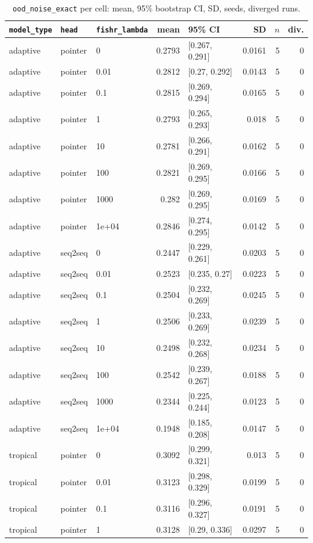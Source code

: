 \documentclass[10pt]{article}
\begin{document}
{\small
\begin{longtable}{lllrlrrr}
\caption{\texttt{ood\_noise\_exact} per cell: mean, 95\% bootstrap CI, SD, seeds, diverged runs.}\label{tab:summary-ood_noise_exact}\\
\toprule
\texttt{model\_type} & \texttt{head} & \texttt{fishr\_lambda} & mean & 95\% CI & SD & $n$ & div.\\
\midrule
\endhead
adaptive & pointer & 0 & 0.2793 & [0.267, 0.291] & 0.0161 & 5 & 0\\
adaptive & pointer & 0.01 & 0.2812 & [0.27, 0.292] & 0.0143 & 5 & 0\\
adaptive & pointer & 0.1 & 0.2815 & [0.269, 0.294] & 0.0165 & 5 & 0\\
adaptive & pointer & 1 & 0.2793 & [0.265, 0.293] & 0.018 & 5 & 0\\
adaptive & pointer & 10 & 0.2781 & [0.266, 0.291] & 0.0162 & 5 & 0\\
adaptive & pointer & 100 & 0.2821 & [0.269, 0.295] & 0.0166 & 5 & 0\\
adaptive & pointer & 1000 & 0.282 & [0.269, 0.295] & 0.0169 & 5 & 0\\
adaptive & pointer & 1e+04 & 0.2846 & [0.274, 0.295] & 0.0142 & 5 & 0\\
adaptive & seq2seq & 0 & 0.2447 & [0.229, 0.261] & 0.0203 & 5 & 0\\
adaptive & seq2seq & 0.01 & 0.2523 & [0.235, 0.27] & 0.0223 & 5 & 0\\
adaptive & seq2seq & 0.1 & 0.2504 & [0.232, 0.269] & 0.0245 & 5 & 0\\
adaptive & seq2seq & 1 & 0.2506 & [0.233, 0.269] & 0.0239 & 5 & 0\\
adaptive & seq2seq & 10 & 0.2498 & [0.232, 0.268] & 0.0234 & 5 & 0\\
adaptive & seq2seq & 100 & 0.2542 & [0.239, 0.267] & 0.0188 & 5 & 0\\
adaptive & seq2seq & 1000 & 0.2344 & [0.225, 0.244] & 0.0123 & 5 & 0\\
adaptive & seq2seq & 1e+04 & 0.1948 & [0.185, 0.208] & 0.0147 & 5 & 0\\
tropical & pointer & 0 & 0.3092 & [0.299, 0.321] & 0.013 & 5 & 0\\
tropical & pointer & 0.01 & 0.3123 & [0.298, 0.329] & 0.0199 & 5 & 0\\
tropical & pointer & 0.1 & 0.3116 & [0.296, 0.327] & 0.0191 & 5 & 0\\
tropical & pointer & 1 & 0.3128 & [0.29, 0.336] & 0.0297 & 5 & 0\\

\end{longtable}}
\end{document}
